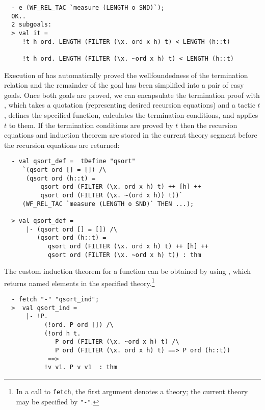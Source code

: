 \begin{session}
\begin{hol}
\begin{verbatim}
  - e (WF_REL_TAC `measure (LENGTH o SND)`);
  OK..
  2 subgoals:
  > val it =
     !t h ord. LENGTH (FILTER (\x. ord x h) t) < LENGTH (h::t)

     !t h ord. LENGTH (FILTER (\x. ~ord x h) t) < LENGTH (h::t)
\end{verbatim}
\end{hol}
\end{session}
%
Execution of  has automatically proved the
wellfoundedness of the termination relation 
and the remainder of the goal has been simplified into a
pair of easy goals. Once both goals are proved, we can encapsulate
the termination proof with , which takes a quotation
(representing desired recursion equations) and a tactic $t$, 
defines the specified function, calculates the termination conditions,
and applies $t$ to them. If the termination conditions are proved by 
$t$ then the recursion equations and induction theorem are stored
in the current theory segment before the recursion equations are returned:

\begin{session}
\begin{hol}
\begin{verbatim}
  - val qsort_def =  tDefine "qsort"
     `(qsort ord [] = []) /\
      (qsort ord (h::t) =
          qsort ord (FILTER (\x. ord x h) t) ++ [h] ++
          qsort ord (FILTER (\x. ~(ord x h)) t))`
     (WF_REL_TAC `measure (LENGTH o SND)` THEN ...);

  > val qsort_def =
      |- (qsort ord [] = []) /\
         (qsort ord (h::t) =
            qsort ord (FILTER (\x. ord x h) t) ++ [h] ++
            qsort ord (FILTER (\x. ~ord x h) t)) : thm
\end{verbatim}
\end{hol}
\end{session}

The custom induction theorem for a function can be obtained by using ,
which returns named elements in the specified theory.\footnote{In a call to \texttt{fetch}, the
first argument denotes a theory; the current theory may be specified by \texttt{"-"}.}
\begin{session}
\begin{hol}
\begin{verbatim}
  - fetch "-" "qsort_ind";
  >  val qsort_ind =
      |- !P.
           (!ord. P ord []) /\
           (!ord h t.
              P ord (FILTER (\x. ~ord x h) t) /\
              P ord (FILTER (\x. ord x h) t) ==> P ord (h::t))
            ==>
           !v v1. P v v1  : thm
\end{verbatim}
\end{hol}
\end{session}

